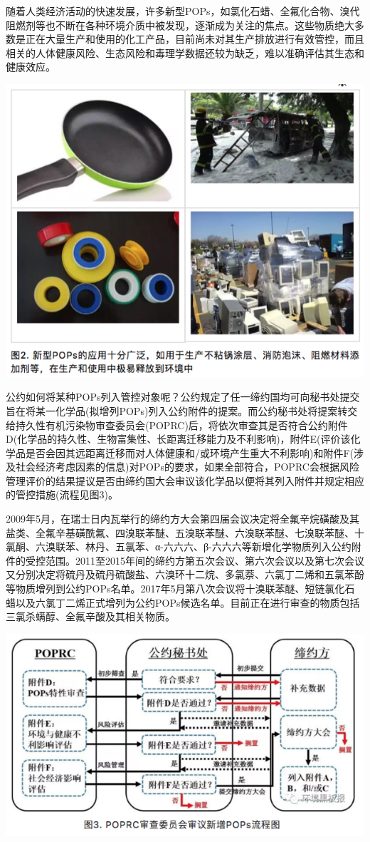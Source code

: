 \documentclass[
]{book}
\begin{document}
随着人类经济活动的快速发展，许多新型POPs，如氯化石蜡、全氟化合物、溴代阻燃剂等也不断在各种环境介质中被发现，逐渐成为关注的焦点。这些物质绝大多数是正在大量生产和使用的化工产品，目前尚未对其生产排放进行有效管控，而且相关的人体健康风险、生态风险和毒理学数据还较为缺乏，难以准确评估其生态和健康效应。

\includegraphics[width=8.33in]{images/gongyue2}

公约如何将某种POPs列入管控对象呢？公约规定了任一缔约国均可向秘书处提交旨在将某一化学品(拟增列POPs)列入公约附件的提案。而公约秘书处将提案转交给持久性有机污染物审查委员会(POPRC)后，将依次审查其是否符合公约附件D(化学品的持久性、生物富集性、长距离迁移能力及不利影响)，附件E(评价该化学品是否会因其远距离迁移而对人体健康和/或环境产生重大不利影响)和附件F(涉及社会经济考虑因素的信息)对POPs的要求，如果全部符合，POPRC会根据风险管理评价的结果提议是否由缔约国大会审议该化学品以便将其列入附件并规定相应的管控措施(流程见图3)。

2009年5月，在瑞士日内瓦举行的缔约方大会第四届会议决定将全氟辛烷磺酸及其盐类、全氟辛基磺酰氟、四溴联苯醚、五溴联苯醚、六溴联苯醚、七溴联苯醚、十氯酮、六溴联苯、林丹、五氯苯、α-六六六、β-六六六等新增化学物质列入公约附件的受控范围。2011至2015年间的缔约方第五次会议、第六次会议以及第七次会议又分别决定将硫丹及硫丹硫酸盐、六溴环十二烷、多氯萘、六氯丁二烯和五氯苯酚等物质增列到公约POPs名单。2017年5月第八次会议将十溴联苯醚、短链氯化石蜡以及六氯丁二烯正式增列为公约POPs候选名单。目前正在进行审查的物质包括三氯杀螨醇、全氟辛酸及其相关物质。

\includegraphics[width=8.33in]{images/gongyue3}
\end{document}
